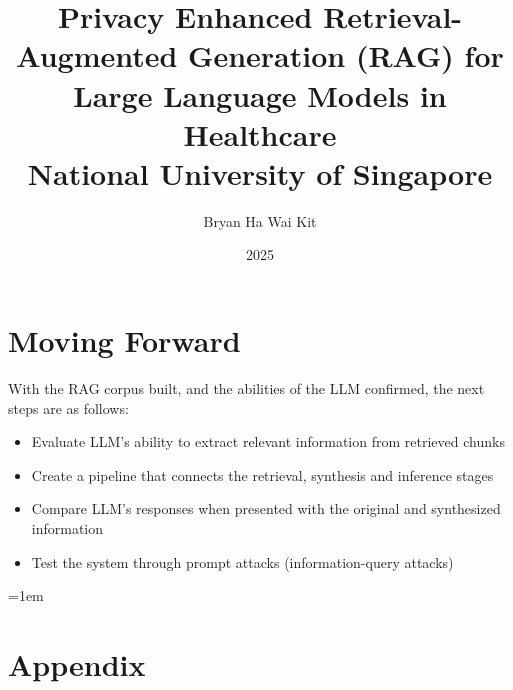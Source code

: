 \documentclass[
    12pt,
    draft
    ]{report}
\title{
  {Privacy Enhanced Retrieval-Augmented Generation (RAG) for Large Language Models in Healthcare}\\
  {\large National University of Singapore}\\
}
\author{Bryan Ha Wai Kit}
\date{2025}
\begin{document}
\maketitle


\tableofcontents
\listoffigures
\listoftables

\newpage
{}





\section{Moving Forward}

With the RAG corpus built, and the abilities of the LLM confirmed, the next steps are as follows:
\begin{itemize}
	\item Evaluate LLM's ability to extract relevant information from retrieved chunks
	\item Create a pipeline that connects the retrieval, synthesis and inference stages
	\item Compare LLM's responses when presented with the original and synthesized information
	\item Test the system through prompt attacks (information-query attacks)
\end{itemize}


\emergencystretch=1em
\printbibliography[title=References]
\nocite{*}
\break

\appendix
\section{Appendix}

\end{document}
